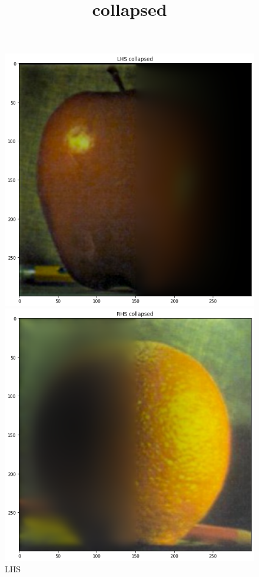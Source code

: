 \documentclass{article}
\begin{document}
\begin{figure}[!htb]
\title{collapsed}
    \includegraphics[width=\linewidth]{LHS recreated.png}
    \caption{LHS}
\endminipage
{}
    \includegraphics[width=\linewidth]{RHS recreated.png}

\end{figure}
\end{document}
